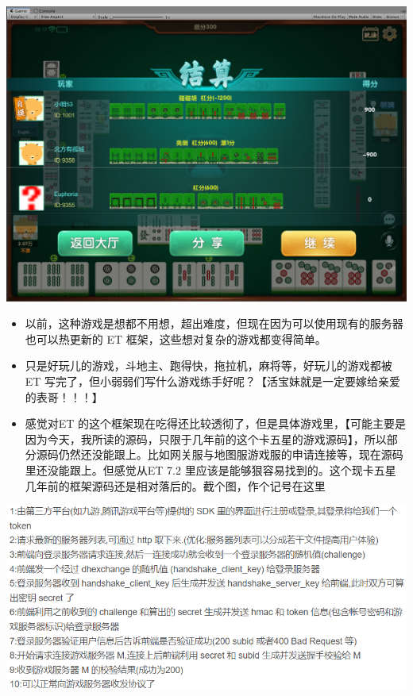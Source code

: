 \documentclass[9pt, b5paper]{article}
\begin{document}
\begin{center}
\includegraphics[width=.9\linewidth]{./pic/readme_20230508_151755.png}
\end{center}
\begin{itemize}
\item 以前，这种游戏是想都不用想，超出难度，但现在因为可以使用现有的服务器也可以热更新的 ET 框架，这些想对复杂的游戏都变得简单。
\item 只是好玩儿的游戏，斗地主、跑得快，拖拉机，麻将等，好玩儿的游戏都被 ET 写完了，但小弱弱们写什么游戏练手好呢？【活宝妹就是一定要嫁给亲爱的表哥！！！】
\item 感觉对ET 的这个框架现在吃得还比较透彻了，但是具体游戏里，【可能主要是因为今天，我所读的源码，只限于几年前的这个卡五星的游戏源码】，所以部分源码仍然还没能跟上。比如网关服与地图服游戏服的申请连接等，现在源码里还没能跟上。但感觉从ET 7.2 里应该是能够狠容易找到的。这个现卡五星几年前的框架源码还是相对落后的。截个图，作个记号在这里
\end{itemize}


\begin{center}
\includegraphics[width=.9\linewidth]{./pic/readme_20230508_172732.png}
\end{center}
\end{document}
